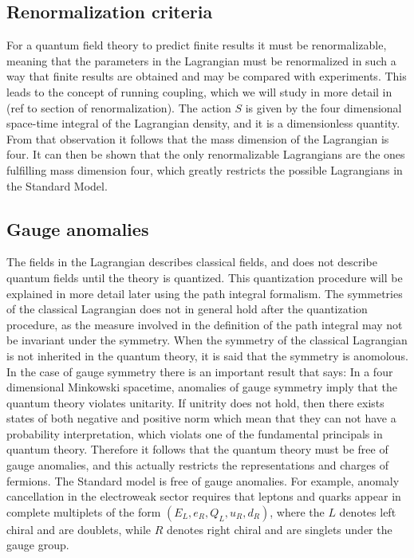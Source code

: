 \subsection{Renormalization criteria}
For a quantum field theory to predict finite results it must be renormalizable, meaning that the parameters in the Lagrangian must be renormalized in such a way that finite results are obtained and may be compared with experiments. This leads to the concept of running coupling, which we will study in more detail in (ref to section of renormalization). The action $S$ is given by the four dimensional space-time integral of the Lagrangian density, and it is a dimensionless quantity. From that observation it follows that the mass dimension of the Lagrangian is four. It can then be shown that the only renormalizable Lagrangians are the ones fulfilling mass dimension four, which greatly restricts the possible Lagrangians in the Standard Model.

\subsection{Gauge anomalies}
The fields in the Lagrangian describes classical fields, and does not describe quantum fields until the theory is quantized. This quantization procedure will be explained in more detail later using the path integral formalism. The symmetries of the classical Lagrangian does not in general hold after the quantization procedure, as the measure involved in the definition of the path integral may not be invariant under the symmetry. When the symmetry of the classical Lagrangian is not inherited in the quantum theory, it is said that the symmetry is anomolous. In the case of gauge symmetry there is an important result that says: In a four dimensional Minkowski spacetime, anomalies of gauge symmetry imply that the quantum theory violates unitarity. If unitrity does not hold, then there exists states of both negative and positive norm which mean that they can not have a probability interpretation, which violats one of the fundamental principals in quantum theory. Therefore it follows that the quantum theory must be free of gauge anomalies, and this actually restricts the representations and charges of fermions. The Standard model is free of gauge anomalies. For example, anomaly cancellation in the electroweak sector requires that leptons and quarks appear in complete multiplets of the form $(E_{L},e_{R},Q_{L},u_{R},d_{R})$, where the $L$ denotes left chiral and are doublets, while $R$ denotes right chiral and are singlets under the gauge group.


